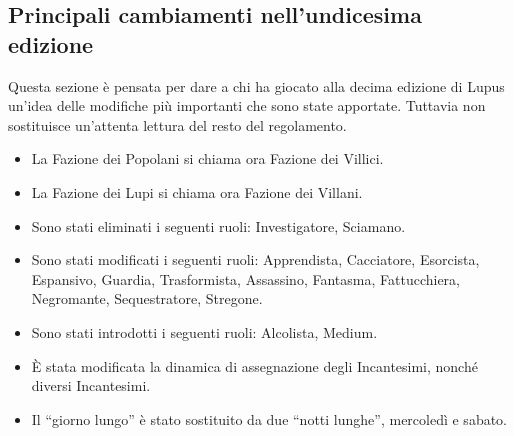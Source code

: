 \documentclass[a4paper,10pt]{article}
\begin{document}



\subsection{Principali cambiamenti nell'undicesima edizione}

Questa sezione è pensata per dare a chi ha giocato alla decima edizione di Lupus un'idea delle modifiche più importanti che sono state apportate. Tuttavia non sostituisce un'attenta lettura del resto del regolamento.

\begin{itemize}
    \item La Fazione dei Popolani si chiama ora Fazione dei Villici.
    \item La Fazione dei Lupi si chiama ora Fazione dei Villani.
    \item Sono stati eliminati i seguenti ruoli: Investigatore, Sciamano.
    \item Sono stati modificati i seguenti ruoli: Apprendista, Cacciatore, Esorcista, Espansivo, Guardia, Trasformista, Assassino, Fantasma, Fattucchiera, Negromante, Sequestratore, Stregone.
    \item Sono stati introdotti i seguenti ruoli: Alcolista, Medium.
    \item È stata modificata la dinamica di assegnazione degli Incantesimi, nonché diversi Incantesimi.
    \item Il ``giorno lungo'' è stato sostituito da due ``notti lunghe'', mercoledì e sabato.
\end{itemize}
\end{document}
